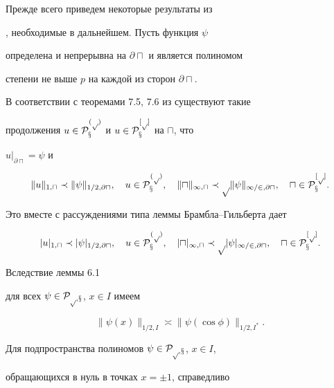 \begin{pf} Прежде всего приведем некоторые результаты из


\cite{ba-cr-ma-pi}, необходимые в дальнейшем. Пусть функция $\psi$


определена и непрерывна на $\partial\sqcap$ и является полиномом


степени не выше $p$ на каждой из сторон $\partial\sqcap$.


В соответствии с теоремами 7.5, 7.6 из \cite{ba-cr-ma-pi} существуют такие


продолжения $u\in\cal P_x^{(p)}$ и $u\in\cal P_x^{[p]}$ на $\sqcap$, что


$u|_{\partial\sqcap}=\psi$ и


\begin{equation}


\|u\|_{1,\sqcap}\prec\|\psi\|_{1/2,\partial\sqcap},\quad


u\in\p_x^{(p)},\quad


\|u\|_{1,\sqcap}\prec p\|\psi\|_{1/2,\partial\sqcap},\quad u\in


\p_x^{[p]}.\label{3.7}


\end{equation}


Это вместе с рассуждениями типа леммы Брамбла--Гильберта дает


\begin{equation}


|u|_{1,\sqcap}\prec|\psi|_{1/2,\partial\sqcap},\quad


u\in\p_x^{(p)},\quad


|u|_{1,\sqcap}\prec p|\psi|_{1/2,\partial\sqcap},\quad


u\in\p_x^{[p]}.


\label{3.20}


\end{equation}


Вследствие леммы 6.1


\cite{ba-cr-ma-pi} для всех $\psi\in\cal P_{p,x}$, $x\in I$ имеем


\begin{equation}


\|\psi(x)\|_{1/2,I}\asymp\|\psi(\cos\phi)\|_{1/2,I^*}.


\label{3.8}


\end{equation}


Для подпространства полиномов $\psi\in\cal P_{p,x}$, $x\in I$,


обращающихся в нуль в точках $x=\pm1$, справедливо



\end{pf}
